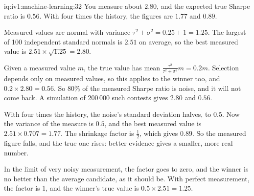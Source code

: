 \begin{solution}{iq:iv1:machine-learning:32}
You measure about $2.80$, and the expected true Sharpe ratio is $0.56$. With four times the history, the figures are $1.77$ and $0.89$.

Measured values are normal with variance $\tau^2 + \sigma^2 = 0.25 + 1 = 1.25$. The largest of 100 independent standard normals is $2.51$ on average, so the best measured value is $2.51 \times \sqrt{1.25} = 2.80$.

Given a measured value $m$, the true value has mean $\frac{\tau^2}{\tau^2 + \sigma^2}m = 0.2m$. Selection depends only on measured values, so this applies to the winner too, and $0.2 \times 2.80 = 0.56$. So 80\% of the measured Sharpe ratio is noise, and it will not come back. A simulation of 200\,000 such contests gives $2.80$ and $0.56$.

With four times the history, the noise's standard deviation halves, to $0.5$. Now the variance of the measure is $0.5$, and the best measured value is $2.51 \times 0.707 = 1.77$. The shrinkage factor is $\frac12$, which gives $0.89$. So the measured figure falls, and the true one rises: better evidence gives a smaller, more real number.

In the limit of very noisy measurement, the factor goes to zero, and the winner is no better than the average candidate, as it should be. With perfect measurement, the factor is 1, and the winner's true value is $0.5 \times 2.51 = 1.25$.



\end{solution}

